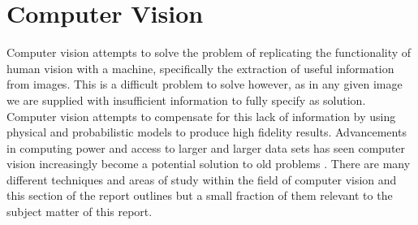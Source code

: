 \section{Computer Vision}

Computer vision attempts to solve the problem of replicating the functionality of human vision with a machine, specifically the extraction of useful information from images. This is a difficult problem to solve however, as in any given image we are supplied with insufficient information to fully specify as solution. Computer vision attempts to compensate for this lack of information by using physical and probabilistic models to produce high fidelity results. Advancements in computing power and access to larger and larger data sets has seen computer vision increasingly become a potential solution to old problems \cite{alg_apps}. There are many different techniques and areas of study within the field of computer vision and this section of the report outlines but a small fraction of them relevant to the subject matter of this report.  



